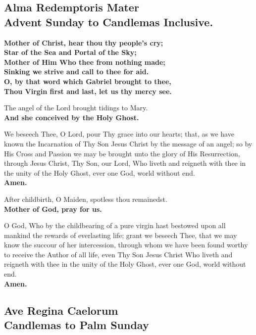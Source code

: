 
\subsection{Alma Redemptoris Mater\\
Advent Sunday to Candlemas Inclusive.}

\textbf{Mother of Christ, hear thou thy people's cry;\\
Star of the Sea and Portal of the Sky;\\
Mother of Him Who thee from nothing made;\\
Sinking we strive and call to thee for aid.\\
O, by that word which Gabriel brought to thee,\\
Thou Virgin first and last, let us thy mercy see.}


The angel of the Lord brought tidings to Mary.\\
\textbf{And she conceived by the Holy Ghost.}

We beseech Thee, O Lord, pour Thy grace into our hearts;
that, as we have known the Incarnation of Thy Son Jesus Christ by the message of an angel;
so by His Cross and Passion we may be brought unto the glory of His Resurrection,
through Jesus Christ, Thy Son, our Lord, Who liveth and reigneth with thee in the unity of the Holy Ghost, ever one God, world without end.\\
\textbf{Amen.}


After childbirth, O Maiden, spotless thou remainedst.\\
\textbf{Mother of God, pray for us.}

O God, Who by the childbearing of a pure virgin hast bestowed upon all mankind the rewards of everlasting life;
grant we beseech Thee, that we may know the succour of her intercession, through whom we have been found worthy to receive the Author of all life,
even Thy Son Jesus Christ Who liveth and reigneth with thee in the unity of the Holy Ghost, ever one God, world without end.\\
\textbf{Amen.}

\newpage

\subsection{Ave Regina Caelorum\\
Candlemas to Palm Sunday}

